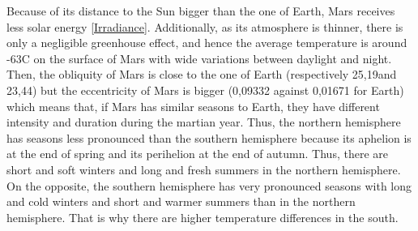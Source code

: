 \label{climate}
Because of its distance to the Sun bigger than the one of Earth, Mars receives less solar energy \ref{Irradiance}. Additionally, as its atmosphere is thinner, there is only a negligible greenhouse effect, and hence the average temperature is around -63\textdegree C on the surface of Mars with wide variations between daylight and night. \\
Then, the obliquity of Mars is close to the one of Earth (respectively 25,19\textdegree and 23,44\textdegree) but the eccentricity of Mars is bigger (0,09332 against 0,01671 for Earth) which means that, if Mars has similar seasons to Earth, they have different intensity and duration during the martian year. Thus, the northern hemisphere has seasons less pronounced than the southern hemisphere because its aphelion is at the end of spring and its perihelion at the end of autumn. Thus, there are short and soft winters and long and fresh summers in the northern hemisphere. On the opposite, the southern hemisphere has very pronounced seasons with long and cold winters and short and warmer summers than in the northern hemisphere. That is why there are higher temperature differences in the south.